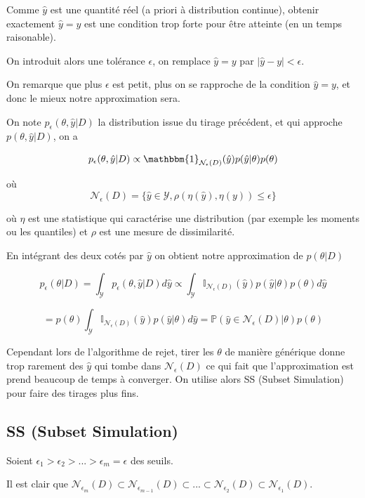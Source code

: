 \documentclass[french,12pt]{article}
\begin{document}
Comme $\hat{y}$ est une quantité réel (a priori à distribution continue),
obtenir exactement $\hat{y} = y$ est une condition trop forte
pour être atteinte (en un temps raisonable).

On introduit alors une tolérance $\epsilon$, on remplace $\hat{y} = y$
par $|\hat{y} - y| < \epsilon$.

On remarque que plus $\epsilon$ est petit, plus on se rapproche de la condition $\hat{y} = y$,
et donc le mieux notre approximation sera.

On note $p_{\epsilon} (\theta, \hat{y} | D)$ la distribution issue
du tirage précédent, et qui approche $p(\theta, \hat{y} |D)$, on a

$$p_{\epsilon} (\theta , \hat{y} | D) \propto \mathbbm{1}_{\mathcal{N}_{\epsilon}(D)} (\hat{y}) p(\hat{y} | \theta)
    p(\theta) $$

où $$\mathcal{N}_{\epsilon}(D) = \{\hat{y} \in \mathcal{Y}, \rho(\eta(\hat{y}), \eta(y)) \leq \epsilon\}$$


où $\eta$ est une statistique qui caractérise une distribution
(par exemple les moments ou les quantiles) et $\rho$ est une mesure de dissimilarité.

En intégrant des deux cotés par $\hat{y}$ on obtient notre approximation de $p(\theta | D)$

$$p_{\epsilon}( \theta | D) = \int_{\mathcal{Y}} p_{\epsilon}( \theta , \hat{y}| D) d \hat{y} \propto \int_{\mathcal{Y}} \mathbb{I}_{\mathcal{N}_\epsilon (D)} (\hat{y}) p( \hat{y}| \theta) p( \theta) d \hat{y}$$

$$ = p( \theta) \int_{\mathcal{Y}} \mathbb{I}_{\mathcal{N}_\epsilon (D)} (\hat{y})  p( \hat{y}| \theta) d \hat{y} = \mathbb{P} (\hat{y} \in \mathcal{N}_{\epsilon} (D)| \theta) p( \theta)$$

Cependant lors de l'algorithme de rejet, tirer les $\theta$ de manière générique donne trop rarement des $\hat{y}$ qui tombe dans $\mathcal{N}_{\epsilon} (D)$
ce qui fait que l'approximation est prend beaucoup de temps à converger. On utilise alors SS (Subset Simulation)
pour faire des tirages plus fins.

\subsection{SS (Subset Simulation)}

Soient $\epsilon_1 > \epsilon_2 > ... >\epsilon_m = \epsilon$ des seuils.

Il est clair que $\mathcal{N}_{\epsilon_m} (D)\subset \mathcal{N}_{\epsilon_{m - 1}} (D)
    \subset ... \subset \mathcal{N}_{\epsilon_{2}} (D) \subset \mathcal{N}_{\epsilon_{1}} (D)$.
\end{document}
